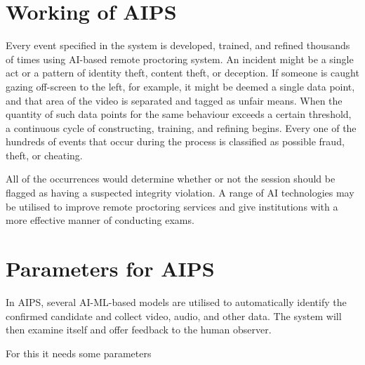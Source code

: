 \documentclass[10pt,a4paper,twoside]{article}
\begin{document}
\section{Working of AIPS}
\item Every event specified in the system is developed, trained, and refined thousands of times using AI-based remote proctoring system. An incident might be a single act or a pattern of identity theft, content theft, or deception. If someone is caught gazing off-screen to the left, for example, it might be deemed a single data point, and that area of the video is separated and tagged as unfair means. When the quantity of such data points for the same behaviour exceeds a certain threshold, a continuous cycle of constructing, training, and refining begins. Every one of the hundreds of events that occur during the process is classified as possible fraud, theft, or cheating.
\item All of the occurrences would determine whether or not the session should be flagged as having a suspected integrity violation. A range of AI technologies may be utilised to improve remote proctoring services and give institutions with a more effective manner of conducting exams. 


\section{Parameters for AIPS}
\item In AIPS, several AI-ML-based models are utilised to automatically identify the confirmed candidate and collect video, audio, and other data. The system will then examine itself and offer feedback to the human observer.
\item For this it needs some parameters
\end{document}
